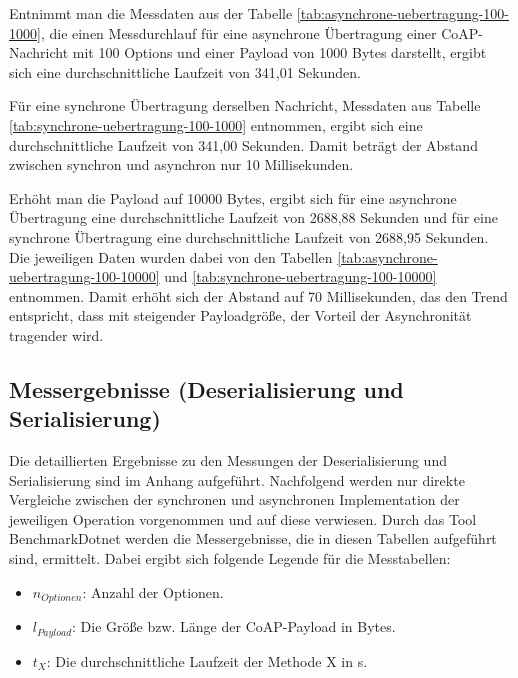Entnimmt man die Messdaten aus der Tabelle \ref{tab:asynchrone-uebertragung-100-1000}, die einen Messdurchlauf für eine asynchrone Übertragung einer CoAP-Nachricht mit 100 Options und einer Payload von 1000 Bytes darstellt, ergibt sich eine durchschnittliche Laufzeit von 341,01 Sekunden.

Für eine synchrone Übertragung derselben Nachricht, Messdaten aus Tabelle \ref{tab:synchrone-uebertragung-100-1000} entnommen, ergibt sich eine durchschnittliche Laufzeit von 341,00 Sekunden. Damit beträgt der Abstand zwischen synchron und asynchron nur 10 Millisekunden.

Erhöht man die Payload auf 10000 Bytes, ergibt sich für eine asynchrone Übertragung eine durchschnittliche Laufzeit von 2688,88 Sekunden und für eine synchrone Übertragung eine durchschnittliche Laufzeit von 2688,95 Sekunden. Die jeweiligen Daten wurden dabei von den Tabellen \ref{tab:asynchrone-uebertragung-100-10000} und \ref{tab:synchrone-uebertragung-100-10000} entnommen. Damit erhöht sich der Abstand auf 70 Millisekunden, das den Trend entspricht, dass mit steigender Payloadgröße, der Vorteil der Asynchronität tragender wird.

\subsection{Messergebnisse (Deserialisierung und Serialisierung)}
\label{subsec:messergebnisse-deserialisierung-serialisierung}

Die detaillierten Ergebnisse zu den Messungen der Deserialisierung und Serialisierung sind im Anhang aufgeführt. Nachfolgend werden nur direkte Vergleiche zwischen der synchronen und asynchronen Implementation der jeweiligen Operation vorgenommen und auf diese verwiesen. Durch das Tool BenchmarkDotnet werden die Messergebnisse, die in diesen Tabellen aufgeführt sind, ermittelt. Dabei ergibt sich folgende Legende für die Messtabellen:
\begin{itemize}
    \item $n_{Optionen}$: Anzahl der Optionen.
    \item $l_{Payload}$: Die Größe bzw. Länge der CoAP-Payload in Bytes.
    \item $t_{X}$: Die durchschnittliche Laufzeit der Methode X in \mu s.
\end{itemize}

